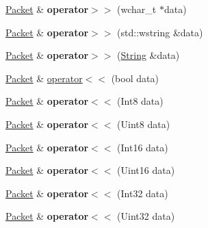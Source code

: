 \begin{DoxyCompactItemize}
\item 
\hypertarget{classsf_1_1Packet_a1444500d29df0991e630ac78933c6282}{\hyperlink{classsf_1_1Packet}{Packet} \& {\bfseries operator$>$$>$} (wchar\-\_\-t $\ast$data)}\label{classsf_1_1Packet_a1444500d29df0991e630ac78933c6282}

\item 
\hypertarget{classsf_1_1Packet_ab74c37a290385fd7b1f962bf954a2005}{\hyperlink{classsf_1_1Packet}{Packet} \& {\bfseries operator$>$$>$} (std\-::wstring \&data)}\label{classsf_1_1Packet_ab74c37a290385fd7b1f962bf954a2005}

\item 
\hypertarget{classsf_1_1Packet_a081233e0cab2182a219b129a1383dc0b}{\hyperlink{classsf_1_1Packet}{Packet} \& {\bfseries operator$>$$>$} (\hyperlink{classsf_1_1String}{String} \&data)}\label{classsf_1_1Packet_a081233e0cab2182a219b129a1383dc0b}

\item 
\hyperlink{classsf_1_1Packet}{Packet} \& \hyperlink{classsf_1_1Packet_aa5a465ed02ba29d83ecdafb0ac3fff21}{operator$<$$<$} (bool data)
\item 
\hypertarget{classsf_1_1Packet_a034b68a4281cae0b53a43af7aa4172f6}{\hyperlink{classsf_1_1Packet}{Packet} \& {\bfseries operator$<$$<$} (Int8 data)}\label{classsf_1_1Packet_a034b68a4281cae0b53a43af7aa4172f6}

\item 
\hypertarget{classsf_1_1Packet_af27e4498bf83151b0591d5f04a8b30e1}{\hyperlink{classsf_1_1Packet}{Packet} \& {\bfseries operator$<$$<$} (Uint8 data)}\label{classsf_1_1Packet_af27e4498bf83151b0591d5f04a8b30e1}

\item 
\hypertarget{classsf_1_1Packet_afda8754ab4f2a34600f0153ba9ff24fa}{\hyperlink{classsf_1_1Packet}{Packet} \& {\bfseries operator$<$$<$} (Int16 data)}\label{classsf_1_1Packet_afda8754ab4f2a34600f0153ba9ff24fa}

\item 
\hypertarget{classsf_1_1Packet_a557cbc0289135209248aca1aa2117c40}{\hyperlink{classsf_1_1Packet}{Packet} \& {\bfseries operator$<$$<$} (Uint16 data)}\label{classsf_1_1Packet_a557cbc0289135209248aca1aa2117c40}

\item 
\hypertarget{classsf_1_1Packet_ad60c9ad6e4e92399e2a36938ad122d05}{\hyperlink{classsf_1_1Packet}{Packet} \& {\bfseries operator$<$$<$} (Int32 data)}\label{classsf_1_1Packet_ad60c9ad6e4e92399e2a36938ad122d05}

\item 
\hypertarget{classsf_1_1Packet_afb113b73749efb662a75deb98257ad34}{\hyperlink{classsf_1_1Packet}{Packet} \& {\bfseries operator$<$$<$} (Uint32 data)}\label{classsf_1_1Packet_afb113b73749efb662a75deb98257ad34}


\end{DoxyCompactItemize}
